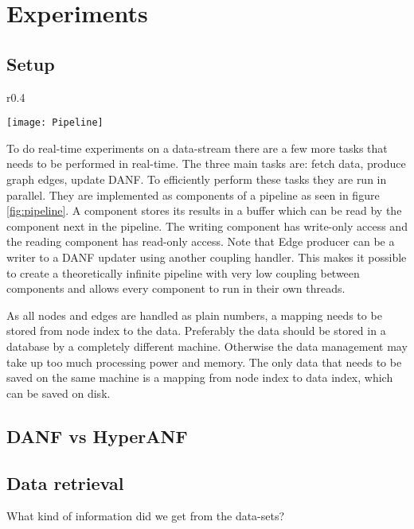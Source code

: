 \chapter{Experiments}

\section{Setup}

\begin{wrapfigure}{r}{0.4\textwidth}
  \begin{center}
    \texttt{[image: Pipeline]}
  \end{center}
  \caption{Parallel-compatible pipeline}
  \label{fig:pipeline}
\end{wrapfigure}

To do real-time experiments on a data-stream there are a few more tasks that needs to be performed in real-time. The three main tasks are: fetch data, produce graph edges, update DANF. To efficiently perform these tasks they are run in parallel. They are implemented as components of a pipeline as seen in figure \ref{fig:pipeline}. A component stores its results in a buffer which can be read by the component next in the pipeline. The writing component has write-only access and the reading component has read-only access. Note that Edge producer can be a writer to a DANF updater using another coupling handler. This makes it possible to create a theoretically infinite pipeline with very low coupling between components and allows every component to run in their own threads.

As all nodes and edges are handled as plain numbers, a mapping needs to be stored from node index to the data. Preferably the data should be stored in a database by a completely different machine. Otherwise the data management may take up too much processing power and memory. The only data that needs to be saved on the same machine is a mapping from node index to data index, which can be saved on disk.




\section{DANF vs HyperANF}

\section{Data retrieval}
What kind of information did we get from the data-sets?
